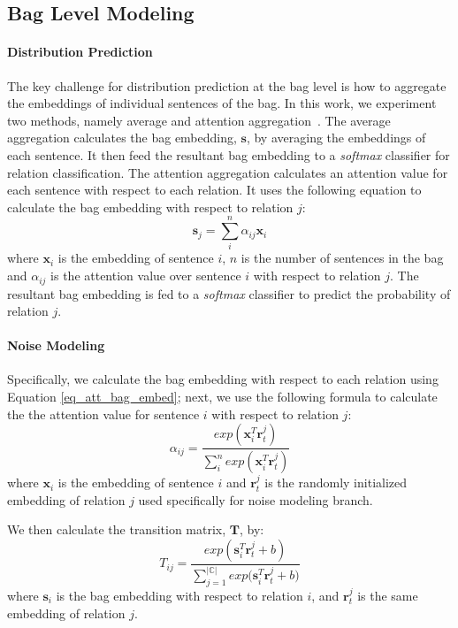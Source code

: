 \subsection{Bag Level Modeling}
\paragraph{Distribution Prediction}
The key challenge for distribution prediction at the bag level is how to aggregate the embeddings of individual sentences of the bag.  
In this work, we experiment two methods, namely average and attention aggregation~\cite{lin2016neural}. 
The average aggregation calculates the bag embedding, $\mathbf{s}$, by averaging the embeddings of each sentence. It then feed the resultant bag embedding to a \emph{softmax} classifier for relation classification.
The attention aggregation calculates an attention value for each sentence with respect to each relation. It uses the following equation to calculate the bag embedding with respect to relation $j$:
\begin{equation}
\mathbf{s}_j = \sum_i^{n}{\alpha_{ij} \mathbf{x}_{i}}
\label{eq_att_bag_embed}
\end{equation}
where $\mathbf{x}_{i}$ is the embedding of sentence $i$, $n$ is the number of sentences in the bag and $\alpha_{ij}$ is the attention value over sentence $i$ with respect to relation $j$. 
The resultant bag embedding is fed to a \emph{softmax} classifier to predict the probability of relation $j$.

\paragraph{Noise Modeling}
 Specifically, we calculate the bag embedding with respect to each relation using Equation \ref{eq_att_bag_embed}; next, we use the following formula to calculate the the attention value for sentence $i$ with respect to relation $j$:
\begin{equation}
\alpha_{ij} = \frac{exp(\mathbf{x}_i^T \mathbf{r}_t^j)}{\sum_i^n{exp(\mathbf{x}_i^T \mathbf{r}_t^j)}}
\end{equation}
where $\mathbf{x}_i$ is the embedding of sentence $i$ and $\mathbf{r}_t^j$ is the randomly initialized embedding of relation $j$ used specifically for noise modeling branch.


We then calculate the transition matrix, $\mathbf{T}$, by:
\begin{equation}
T_{ij} = \frac{exp({\mathbf{s}_i^T \mathbf{r}_t^j  + b})}{\sum_{j=1}^{|\mathbb{C}|}{exp(\mathbf{s}_i^T \mathbf{r}_t^j + b})}
\end{equation}
where $\mathbf{s}_i$ is the bag embedding with respect to relation $i$, and $\mathbf{r}_t^j$ is the same embedding of relation $j$.


